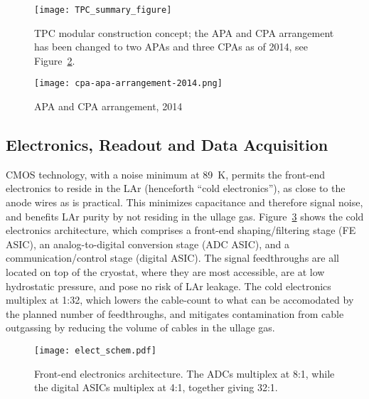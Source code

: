 \begin{figure}[htbp]
\centering
\texttt{[image: TPC\_summary\_figure]}
\caption{TPC modular construction concept; the APA and CPA arrangement has been changed to two APAs and three CPAs as of 2014, see Figure~\ref{fig:cpa-apa-arrangement-2014}.}
\label{fig:tpc-concept}
\end{figure}

\begin{figure}[htbp]
\centering
\texttt{[image: cpa-apa-arrangement-2014.png]}
\caption{APA and CPA arrangement, 2014}
\label{fig:cpa-apa-arrangement-2014}
\end{figure}


\subsection{Electronics, Readout and Data Acquisition}
\label{sec:det_electronics}

CMOS technology, with a noise minimum at 89~K,
permits the front-end electronics to reside in the LAr (henceforth ``cold electronics''),
as close to the anode wires as is practical.
This minimizes capacitance and therefore signal noise,
and benefits LAr purity by not residing in the ullage gas.
Figure~\ref{fig:elect_schem_intro_copy} shows the cold electronics architecture,
which comprises a front-end shaping/filtering stage (FE ASIC),
an analog-to-digital conversion stage (ADC ASIC), and a communication/control stage (digital ASIC).
The signal feedthroughs are all located on top of the cryostat, where they are most accessible,
are at low hydrostatic pressure, and pose no risk of LAr leakage.
The cold electronics multiplex at 1:32,
which lowers the cable-count to what can be accomodated by the planned number of feedthroughs,
and mitigates contamination from cable outgassing
by reducing the volume of cables in the ullage gas.

\begin{figure}[htbp]
\centering
\texttt{[image: elect\_schem.pdf]}
\caption{Front-end electronics architecture.
         The ADCs multiplex at 8:1, while the digital ASICs multiplex at 4:1, together giving 32:1.
        }
\label{fig:elect_schem_intro_copy}
\end{figure}




